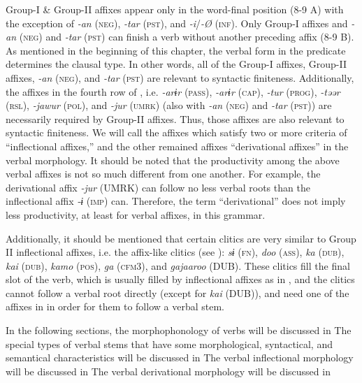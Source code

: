 Group-I \& Group-II affixes appear only in the word-final position (8-9 A) with the exception of \textit{-an} (\textsc{neg}), \textit{-tar} (\textsc{pst}), and \textit{-i}/\textit{-Ø} (\textsc{inf}). Only Group-I affixes and \textit{-an} (\textsc{neg}) and \textit{-tar} (\textsc{pst}) can finish a verb without another preceding affix (8-9 B). As mentioned in the beginning of this chapter, the verbal form in the predicate determines the clausal type. In other words, all of the Group-I affixes, Group-II affixes, \textit{-an} (\textsc{neg}), and \textit{-tar} (\textsc{pst}) are relevant to syntactic finiteness. Additionally, the affixes in the fourth row of , i.e. \textit{-arɨr} (\textsc{pass}), \textit{-arɨr} (\textsc{cap}), \textit{-tur} (\textsc{prog}), \textit{-təər} (\textsc{rsl}), \textit{-jawur} (\textsc{pol}), and \textit{-jur} (\textsc{umrk}) (also with \textit{-an} (\textsc{neg}) and \textit{-tar} (\textsc{pst})) are necessarily required by Group-II affixes. Thus, those affixes are also relevant to syntactic finiteness. We will call the affixes which satisfy two or more criteria of  “inflectional affixes,” and the other remained affixes “derivational affixes” in the verbal morphology. It should be noted that the productivity among the above verbal affixes is not so much different from one another. For example, the derivational affix \textit{-jur} (UMRK) can follow no less verbal roots than the inflectional affix \textit{-ɨ} (\textsc{imp}) can. Therefore, the term “derivational” does not imply less productivity, at least for verbal affixes, in this grammar.

  Additionally, it should be mentioned that certain clitics are very similar to Group II inflectional affixes, i.e. the affix-like clitics (see ): \textit{sɨ} (\textsc{fn}), \textit{doo} (\textsc{ass}), \textit{ka} (\textsc{dub}), \textit{kai} (\textsc{dub}), \textit{kamo} (\textsc{pos}), \textit{ga} (\textsc{cfm3}), and \textit{gajaaroo} (DUB). These clitics fill the final slot of the verb, which is usually filled by inflectional affixes as in , and the clitics cannot follow a verbal root directly (except for \textit{kai} (DUB)), and need one of the affixes in  in order for them to follow a verbal stem.

  In the following sections, the morphophonology of verbs will be discussed in  The special types of verbal stems that have some morphological, syntactical, and semantical characteristics will be discussed in  The verbal inflectional morphology will be discussed in  The verbal derivational morphology will be discussed in 

